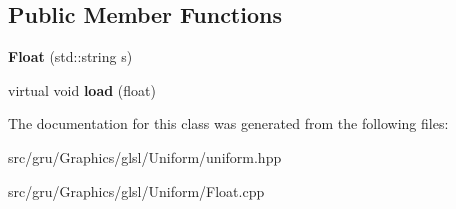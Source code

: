 \subsection*{\-Public \-Member \-Functions}
\begin{DoxyCompactItemize}
\item 
\hypertarget{classglutpp_1_1glsl_1_1Uniform_1_1Scalar_1_1Float_abab30ae8dae2e4a44446f797f4f88f84}{{\bfseries \-Float} (std\-::string s)}\label{classglutpp_1_1glsl_1_1Uniform_1_1Scalar_1_1Float_abab30ae8dae2e4a44446f797f4f88f84}

\item 
\hypertarget{classglutpp_1_1glsl_1_1Uniform_1_1Scalar_1_1Float_a164add400fc3572a72ac8ea4a6fe7860}{virtual void {\bfseries load} (float)}\label{classglutpp_1_1glsl_1_1Uniform_1_1Scalar_1_1Float_a164add400fc3572a72ac8ea4a6fe7860}

\end{DoxyCompactItemize}


\-The documentation for this class was generated from the following files\-:\begin{DoxyCompactItemize}
\item 
src/gru/\-Graphics/glsl/\-Uniform/uniform.\-hpp\item 
src/gru/\-Graphics/glsl/\-Uniform/\-Float.\-cpp\end{DoxyCompactItemize}
